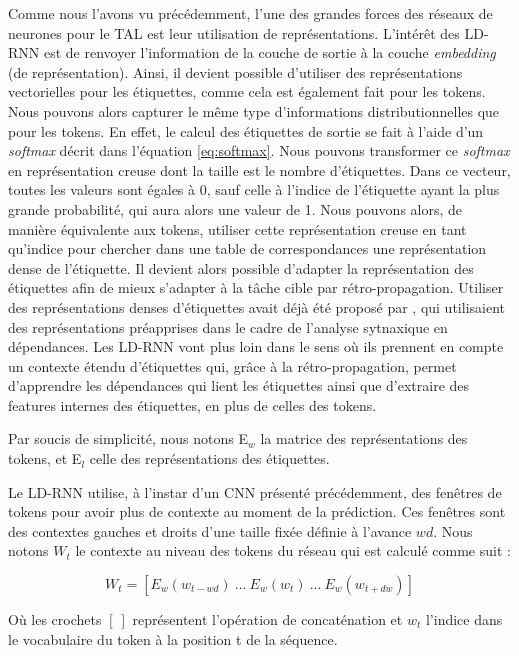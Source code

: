 \documentclass[citation\_needed]{subfiles}
\begin{document}
Comme nous l'avons vu précédemment, l'une des grandes forces des réseaux de neurones pour le TAL est leur utilisation de représentations. L'intérêt des LD-RNN est de renvoyer l'information de la couche de sortie à la couche \textit{embedding} (de représentation). Ainsi, il devient possible d'utiliser des représentations vectorielles pour les étiquettes, comme cela est également fait pour les tokens. Nous pouvons alors capturer le même type d'informations distributionnelles que pour les tokens. En effet, le calcul des étiquettes de sortie se fait à l'aide d'un \textit{softmax} décrit dans l'équation \ref{eq:softmax}. Nous pouvons transformer ce \textit{softmax} en représentation creuse dont la taille est le nombre d'étiquettes. Dans ce vecteur, toutes les valeurs sont égales à 0, sauf celle à l'indice de l'étiquette ayant la plus grande probabilité, qui aura alors une valeur de 1. Nous pouvons alors, de manière équivalente aux tokens, utiliser cette représentation creuse en tant qu'indice pour chercher dans une table de correspondances une représentation dense de l'étiquette. Il devient alors possible d'adapter la représentation des étiquettes afin de mieux s'adapter à la tâche cible par rétro-propagation. Utiliser des représentations denses d'étiquettes avait déjà été proposé par \citet{chen2014fast}, qui utilisaient des représentations préapprises dans le cadre de l'analyse sytnaxique en dépendances. Les LD-RNN vont plus loin dans le sens où ils prennent en compte un contexte étendu d'étiquettes qui, grâce à la rétro-propagation, permet d'apprendre les dépendances qui lient les étiquettes ainsi que d'extraire des features internes des étiquettes, en plus de celles des tokens.

Par soucis de simplicité, nous notons E$_{w}$ la matrice des représentations des tokens, et E$_{l}$ celle des représentations des étiquettes.

Le LD-RNN utilise, à l'instar d'un CNN présenté précédemment, des fenêtres de tokens pour avoir plus de contexte au moment de la prédiction. Ces fenêtres sont des contextes gauches et droits d'une taille fixée définie à l'avance $wd$. Nous notons $W_{t}$ le contexte au niveau des tokens du réseau qui est calculé comme suit :

\begin{equation}\label{eq:LD-RNN-word-window}
W_{t} = \left[ E_{w}(w_{t-wd})\ ...\ E_{w}(w_{t})\ ...\ E_{w}(w_{t+dw}) \right]
\end{equation}

Où les crochets $[\ ]$ représentent l'opération de concaténation et $w_{t}$ l'indice dans le vocabulaire du token à la position t de la séquence.
\end{document}
